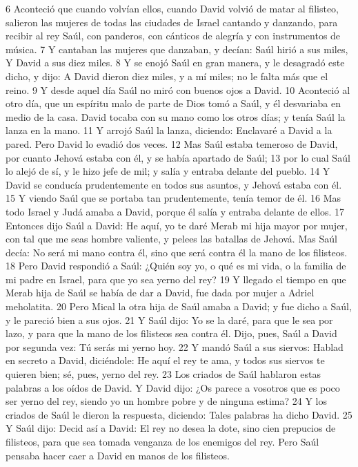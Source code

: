 6 Aconteció que cuando volvían ellos, cuando David volvió de matar al filisteo, salieron las mujeres de todas las ciudades de Israel cantando y danzando, para recibir al rey Saúl, con panderos, con cánticos de alegría y con instrumentos de música.
7 Y cantaban las mujeres que danzaban, y decían:
Saúl hirió a sus miles,
Y David a sus diez miles. 
8 Y se enojó Saúl en gran manera, y le desagradó este dicho, y dijo: A David dieron diez miles, y a mí miles; no le falta más que el reino.
9 Y desde aquel día Saúl no miró con buenos ojos a David. 
10 Aconteció al otro día, que un espíritu malo de parte de Dios tomó a Saúl, y él desvariaba en medio de la casa. David tocaba con su mano como los otros días; y tenía Saúl la lanza en la mano.
11 Y arrojó Saúl la lanza, diciendo: Enclavaré a David a la pared. Pero David lo evadió dos veces.
12 Mas Saúl estaba temeroso de David, por cuanto Jehová estaba con él, y se había apartado de Saúl;
13 por lo cual Saúl lo alejó de sí, y le hizo jefe de mil; y salía y entraba delante del pueblo.
14 Y David se conducía prudentemente en todos sus asuntos, y Jehová estaba con él.
15 Y viendo Saúl que se portaba tan prudentemente, tenía temor de él.
16 Mas todo Israel y Judá amaba a David, porque él salía y entraba delante de ellos.
17 Entonces dijo Saúl a David: He aquí, yo te daré Merab mi hija mayor por mujer, con tal que me seas hombre valiente, y pelees las batallas de Jehová. Mas Saúl decía: No será mi mano contra él, sino que será contra él la mano de los filisteos.
18 Pero David respondió a Saúl: ¿Quién soy yo, o qué es mi vida, o la familia de mi padre en Israel, para que yo sea yerno del rey?
19 Y llegado el tiempo en que Merab hija de Saúl se había de dar a David, fue dada por mujer a Adriel meholatita.
20 Pero Mical la otra hija de Saúl amaba a David; y fue dicho a Saúl, y le pareció bien a sus ojos.
21 Y Saúl dijo: Yo se la daré, para que le sea por lazo, y para que la mano de los filisteos sea contra él. Dijo, pues, Saúl a David por segunda vez: Tú serás mi yerno hoy.
22 Y mandó Saúl a sus siervos: Hablad en secreto a David, diciéndole: He aquí el rey te ama, y todos sus siervos te quieren bien; sé, pues, yerno del rey.
23 Los criados de Saúl hablaron estas palabras a los oídos de David. Y David dijo: ¿Os parece a vosotros que es poco ser yerno del rey, siendo yo un hombre pobre y de ninguna estima?
24 Y los criados de Saúl le dieron la respuesta, diciendo: Tales palabras ha dicho David.
25 Y Saúl dijo: Decid así a David: El rey no desea la dote, sino cien prepucios de filisteos, para que sea tomada venganza de los enemigos del rey. Pero Saúl pensaba hacer caer a David en manos de los filisteos.
